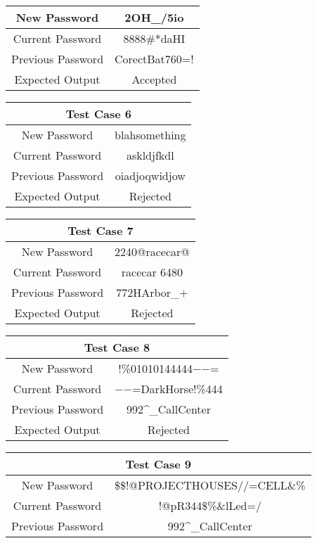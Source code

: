 \documentclass[12pt,letterpaper]{article}
\begin{document}
\begin{table}[h]
\begin{centering}
\begin{tabular}{||c|c||}
  \hline
  New Password & 2OH\_/5io \\
  \hline
  Current Password & 8888\#*daHI\\
  \hline
  Previous Password & CorectBat760=! \\
  \hline
  Expected Output & Accepted \\
  \hline
  \end{tabular}
  \begin{tabular}{||c|c||}
  \hline
  \multicolumn{2}{||c||}{Test Case 6} \\
  \hline
  New Password & blahsomething \\
  \hline
  Current Password & askldjfkdl \\
  \hline
  Previous Password & oiadjoqwidjow \\
  \hline
  Expected Output & Rejected \\
  \hline
  \end{tabular}
  \begin{tabular}{||c|c||}
  \hline
  \multicolumn{2}{||c||}{Test Case 7} \\
  \hline
  New Password & 2240@racecar@ \\
  \hline
  Current Password & racecar 6480 \\
  \hline
  Previous Password & 772HArbor\_+ \\
  \hline
  Expected Output & Rejected \\
  \hline
  \end{tabular}
  \begin{tabular}{||c|c||}
  \hline
  \multicolumn{2}{||c||}{Test Case 8} \\
  \hline
  New Password & !\%01010144444$-$$-$= \\
  \hline
  Current Password & $-$$-$=DarkHorse!\%444 \\
  \hline
  Previous Password & 992\^{}\_CallCenter \\
  \hline
  Expected Output & Rejected \\
  \hline
  \end{tabular}
  \begin{tabular}{||c|c||}
  \hline
  \multicolumn{2}{||c||}{Test Case 9} \\
  \hline
  New Password & \$\$!@PROJECTHOUSES//=CELL\&\% \\
  \hline
  Current Password & !@pR344\$\%\&lLed=/ \\
  \hline
  Previous Password & 992\^{}\_CallCenter \\

\end{tabular}
\end{centering}
\end{table}
\end{document}
